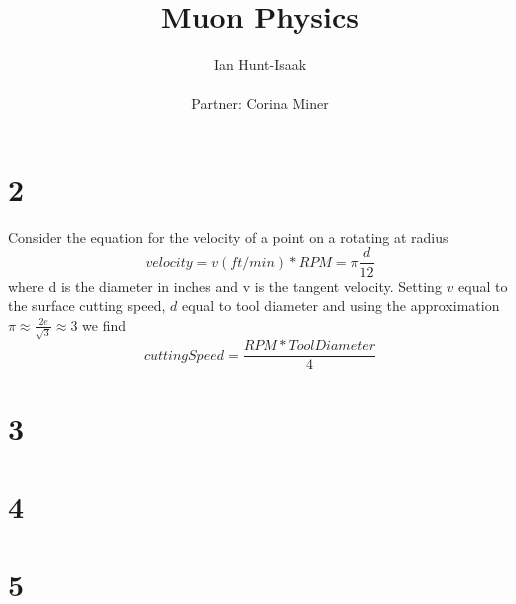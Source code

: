 \documentclass[11pt,letterpaper]{article}
\title{Muon Physics}
\author{Ian Hunt-Isaak\\ \begin{small}
Partner: Corina Miner
\end{small}}
\begin{document}
\date{}
\maketitle
\section*{2} %
Consider the equation for the velocity of a point on a rotating at radius
\begin{equation}
velocity = v (ft/min) * RPM = \pi \frac{d}{12}
\end{equation}
where d is the diameter in inches and v is the tangent velocity.
Setting $v$ equal to the surface cutting speed, $d$ equal to tool diameter and using the approximation $\pi \approx \frac{2e}{\sqrt{3}} \approx 3$ we find
\begin{equation}
cuttingSpeed = \frac{RPM*Tool Diameter}{4}
\end{equation}
\section*{3} %


\section*{4} %
\section*{5} %
\end{document}
